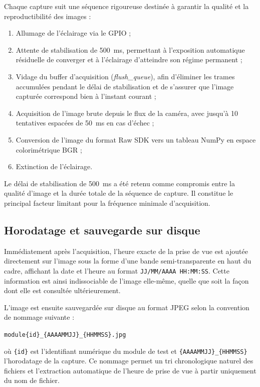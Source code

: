Chaque capture suit une séquence rigoureuse destinée à garantir la
qualité et la reproductibilité des images :

\begin{enumerate}
    \item Allumage de l'éclairage via le GPIO ;
    \item Attente de stabilisation de 500~ms, permettant à l'exposition
          automatique résiduelle de converger et à l'éclairage
          d'atteindre son régime permanent ;
    \item Vidage du buffer d'acquisition (\textit{flush\_queue}),
          afin d'éliminer les trames accumulées pendant le délai de
          stabilisation et de s'assurer que l'image capturée correspond
          bien à l'instant courant ;
    \item Acquisition de l'image brute depuis le flux de la caméra,
          avec jusqu'à 10 tentatives espacées de 50~ms en cas d'échec ;
    \item Conversion de l'image du format Raw SDK vers un tableau
          NumPy en espace colorimétrique BGR ;
    \item Extinction de l'éclairage.
\end{enumerate}

Le délai de stabilisation de 500~ms a été retenu comme compromis entre
la qualité d'image et la durée totale de la séquence de capture. Il
constitue le principal facteur limitant pour la fréquence minimale
d'acquisition.

\subsection{Horodatage et sauvegarde sur disque}

Immédiatement après l'acquisition, l'heure exacte de la prise de vue
est ajoutée directement sur l'image sous la forme d'une bande
semi-transparente en haut du cadre, affichant la date et l'heure au
format \texttt{JJ/MM/AAAA HH:MM:SS}. Cette information est ainsi
indissociable de l'image elle-même, quelle que soit la façon dont
elle est consultée ultérieurement.

L'image est ensuite sauvegardée sur disque au format JPEG selon la
convention de nommage suivante :

\begin{center}
    \texttt{module\{id\}\_\{AAAAMMJJ\}\_\{HHMMSS\}.jpg}
\end{center}

où \texttt{\{id\}} est l'identifiant numérique du module de test et
\texttt{\{AAAAMMJJ\}\_\{HHMMSS\}} l'horodatage de la capture. Ce
nommage permet un tri chronologique naturel des fichiers et l'extraction
automatique de l'heure de prise de vue à partir uniquement du nom de fichier.

